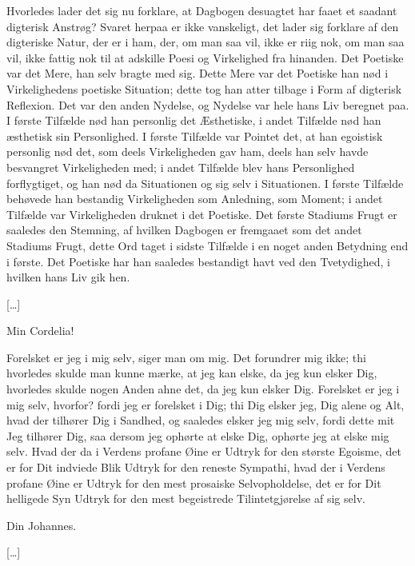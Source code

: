 \documentclass[12pt,a4paper]{article}
\begin{document}
Hvorledes lader det sig nu forklare, at Dagbogen desuagtet har faaet et saadant digterisk Anstrøg? Svaret herpaa er ikke vanskeligt, det lader sig forklare af den digteriske Natur, der er i ham, der, om man saa vil, ikke er riig nok, om man saa vil, ikke fattig nok til at adskille Poesi og Virkelighed fra hinanden. Det Poetiske var det Mere, han selv bragte med sig. Dette Mere var det Poetiske han nød i Virkelighedens poetiske Situation; dette tog han atter tilbage i Form af digterisk Reflexion. Det var den anden Nydelse, og Nydelse var hele hans Liv beregnet paa. I første Tilfælde nød han personlig det Æsthetiske, i andet Tilfælde nød han æsthetisk sin Personlighed. I første Tilfælde var Pointet det, at han egoistisk personlig nød det, som deels Virkeligheden gav ham, deels han selv havde besvangret Virkeligheden med; i andet Tilfælde blev hans Personlighed forflygtiget, og han nød da Situationen og sig selv i Situationen. I første Tilfælde behøvede han bestandig Virkeligheden som Anledning, som Moment; i andet Tilfælde var Virkeligheden druknet i det Poetiske. Det første Stadiums Frugt er saaledes den Stemning, af hvilken Dagbogen er fremgaaet som det andet Stadiums Frugt, dette Ord taget i sidste Tilfælde i en noget anden Betydning end i første. Det Poetiske har han saaledes bestandigt havt ved den Tvetydighed, i hvilken hans Liv gik hen.

[…]

Min Cordelia!

Forelsket er jeg i mig selv, siger man om mig. Det forundrer mig ikke; thi hvorledes skulde man kunne mærke, at jeg kan elske, da jeg kun elsker Dig, hvorledes skulde nogen Anden ahne det, da jeg kun elsker Dig. Forelsket er jeg i mig selv, hvorfor? fordi jeg er forelsket i Dig; thi Dig elsker jeg, Dig alene og Alt, hvad der tilhører Dig i Sandhed, og saaledes elsker jeg mig selv, fordi dette mit Jeg tilhører Dig, saa dersom jeg ophørte at elske Dig, ophørte jeg at elske mig selv. Hvad der da i Verdens profane Øine er Udtryk for den største Egoisme, det er for Dit indviede Blik Udtryk for den reneste Sympathi, hvad der i Verdens profane Øine er Udtryk for den mest prosaiske Selvopholdelse, det er for Dit helligede Syn Udtryk for den mest begeistrede Tilintetgjørelse af sig selv.

Din Johannes.

[…]
\end{document}
